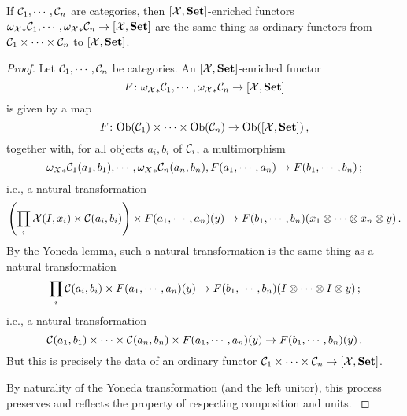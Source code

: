 \documentclass{article}
\begin{document}
\begin{proposition}
  If ${\mathcal{C}}_1,\cdots,{\mathcal{C}}_n$ are categories, then $[\mathcal X,{\normalfont\textbf{Set}}]$-enriched functors ${\omega_\mathcal X}_*{\mathcal{C}}_1,\cdots,{\omega_\mathcal X}_*{\mathcal{C}}_n\to[\mathcal X,{\normalfont\textbf{Set}}]$ are the same thing as ordinary functors from ${\mathcal{C}}_1\times\cdots\times{\mathcal{C}}_n$ to $[\mathcal X,{\normalfont\textbf{Set}}]$.
\end{proposition}
\begin{proof}
  Let ${\mathcal{C}}_1,\cdots,{\mathcal{C}}_n$ be categories.  
  An $[\mathcal X,{\normalfont\textbf{Set}}]$-enriched functor
  \[
    F \colon {\omega_\mathcal X}_*{\mathcal{C}}_1,\cdots,{\omega_\mathcal X}_*{\mathcal{C}}_n \to [\mathcal X,{\normalfont\textbf{Set}}]
    \]
  is given by a map
  \[
    F\colon \text{Ob}({\mathcal{C}}_1)\times\cdots\times\text{Ob}({\mathcal{C}}_n) \to \text{Ob}([\mathcal X,{\normalfont\textbf{Set}}])\,,
    \]
  together with, for all objects $a_i,b_i$ of ${\mathcal{C}}_i$, a multimorphism
  \[
    {\omega_X}_*{\mathcal{C}}_1(a_1,b_1),\cdots,{\omega_X}_*{\mathcal{C}}_n(a_n,b_n),F(a_1,\cdots,a_n)\to F(b_1,\cdots,b_n)\,;
    \]
  i.e., a natural transformation
  \[
    \left(\prod_i \mathcal X(I,x_i)\times{\mathcal{C}}(a_i,b_i)\right) \times F(a_1,\cdots,a_n)(y) \to F(b_1,\cdots,b_n)(x_1\otimes\cdots\otimes x_n\otimes y)\,.
    \]
  By the Yoneda lemma, such a natural transformation is the same thing as a natural transformation
  \[
    \prod_i {\mathcal{C}}(a_i,b_i) \times F(a_1,\cdots,a_n)(y) \to F(b_1,\cdots,b_n)(I \otimes \cdots \otimes I \otimes y)\,;
    \]
  i.e., a natural transformation
  \[
    {\mathcal{C}}(a_1,b_1)\times\cdots\times{\mathcal{C}}(a_n,b_n) \times F(a_1,\cdots,a_n)(y) \to F(b_1,\cdots,b_n)(y)\,.
    \]
  But this is precisely the data of an ordinary functor ${\mathcal{C}}_1\times\cdots\times{\mathcal{C}}_n \to [\mathcal X,{\normalfont\textbf{Set}}]$.

  By naturality of the Yoneda transformation (and the left unitor), this process preserves and reflects the property of respecting composition and units.
  \label{PropOmegaProperty}
\end{proof}
\end{document}
